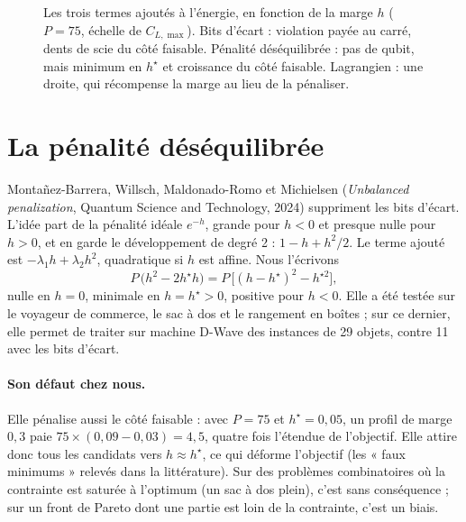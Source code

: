 \begin{figure}[htbp]
\centering

\caption{Les trois termes ajoutés à l'énergie, en fonction de la marge $h$ ($P=75$, échelle de $C_{L,\max}$). Bits d'écart : violation payée au carré, dents de scie du côté faisable. Pénalité déséquilibrée : pas de qubit, mais minimum en $h^\star$ et croissance du côté faisable. Lagrangien : une droite, qui récompense la marge au lieu de la pénaliser.}\label{fig:penalites}
\end{figure}

\section{La pénalité déséquilibrée}
Montañez-Barrera, Willsch, Maldonado-Romo et Michielsen (\emph{Unbalanced penalization}, Quantum Science and Technology, 2024) suppriment les bits d'écart. L'idée part de la pénalité idéale $e^{-h}$, grande pour $h<0$ et presque nulle pour $h>0$, et en garde le développement de degré 2 : $1-h+h^2/2$. Le terme ajouté est $-\lambda_1h+\lambda_2h^2$, quadratique si $h$ est affine. Nous l'écrivons
\[ P\,\big(h^2-2h^\star h\big)=P\,\big[(h-h^\star)^2-h^{\star2}\big], \]
nulle en $h=0$, minimale en $h=h^\star>0$, positive pour $h<0$. Elle a été testée sur le voyageur de commerce, le sac à dos et le rangement en boîtes ; sur ce dernier, elle permet de traiter sur machine D-Wave des instances de 29 objets, contre 11 avec les bits d'écart.

\paragraph{Son défaut chez nous.} Elle pénalise aussi le côté faisable : avec $P=75$ et $h^\star=0{,}05$, un profil de marge $0{,}3$ paie $75\times(0{,}09-0{,}03)=4{,}5$, quatre fois l'étendue de l'objectif. Elle attire donc tous les candidats vers $h\approx h^\star$, ce qui déforme l'objectif (les « faux minimums » relevés dans la littérature). Sur des problèmes combinatoires où la contrainte est saturée à l'optimum (un sac à dos plein), c'est sans conséquence ; sur un front de Pareto dont une partie est loin de la contrainte, c'est un biais.

